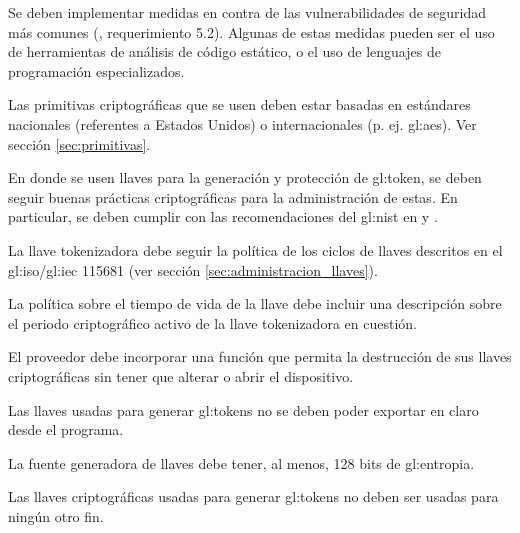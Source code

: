 {
  Se deben implementar medidas en contra de las vulnerabilidades de
  seguridad más comunes (\cite{dss_pa}, requerimiento 5.2). Algunas de estas
  medidas pueden ser el uso de herramientas de análisis de código estático,
  o el uso de lenguajes de programación especializados.
}

{
  Las primitivas criptográficas que se usen deben estar basadas en
  estándares nacionales (referentes a Estados Unidos) o internacionales (p. ej.
  \gls{gl:aes}). Ver sección \ref{sec:primitivas}.
}



{
  En donde se usen llaves para la generación y protección de \gls{gl:token},
  se deben seguir buenas prácticas criptográficas para la administración de
  estas. En particular, se deben cumplir con las recomendaciones del
  \gls{gl:nist} en \cite{nist_llaves} y \cite{nist_disenio_llaves}.

  {
    La llave tokenizadora debe seguir la política de los ciclos de llaves
    descritos en el \acrshort{gl:iso}/\acrshort{gl:iec} 115681 (ver
    sección \ref{sec:administracion_llaves}).
  }

  {
    La política sobre el tiempo de vida de la llave debe incluir una
    descripción sobre el periodo criptográfico activo de la llave
    tokenizadora en cuestión.
  }

  {
   	El proveedor debe incorporar una función que permita la destrucción
   	de sus llaves criptográficas sin tener que alterar o abrir el
   	dispositivo.
  }

  {
    Las llaves usadas para generar \glspl{gl:token} no se deben poder
    exportar en claro desde el programa.
  }

  {
    La fuente generadora de llaves debe tener, al menos, 128 bits de
    \gls{gl:entropia}.
  }

  {
    Las llaves criptográficas usadas para generar \glspl{gl:token} no
    deben ser usadas para ningún otro fin.
  }
}

